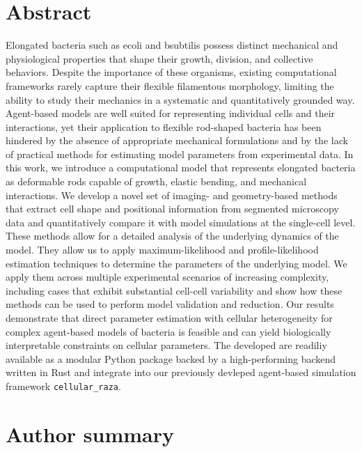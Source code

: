 \section*{Abstract}
Elongated bacteria such as \acl{ecoli} and \acl{bsubtilis} possess distinct mechanical
and physiological properties that shape their growth, division, and collective behaviors.
Despite the importance of these organisms, existing computational frameworks rarely capture their
flexible filamentous morphology, limiting the ability to study their mechanics in a systematic and
quantitatively grounded way.
Agent-based models are well suited for representing individual cells and their interactions, yet
their application to flexible rod-shaped bacteria has been hindered by the absence of appropriate
mechanical formulations and by the lack of practical methods for estimating model parameters from
experimental data.
In this work, we introduce a computational model that represents elongated bacteria as deformable
rods capable of growth, elastic bending, and mechanical interactions.
We develop a novel set of imaging- and geometry-based methods that extract cell shape and positional
information from segmented microscopy data and quantitatively compare it with model simulations at
the single-cell level.
These methods allow for a detailed analysis of the underlying dynamics of the model.
They allow us to apply maximum-likelihood and profile-likelihood estimation techniques to determine
the parameters of the underlying model.
We apply them across multiple experimental scenarios of increasing complexity, including cases that
exhibit substantial cell-cell variability and show how these methods can be used to perform model
validation and reduction.
Our results demonstrate that direct parameter estimation with cellular heterogeneity for complex
agent-based models of bacteria is feasible and can yield biologically interpretable constraints on
cellular parameters.
The developed are readiliy available as a modular Python package backed by a high-performing backend
written in Rust and integrate into our previously devleped agent-based simulation framework
\texttt{cellular\_raza}.

\section*{Author summary}

\pagebreak

